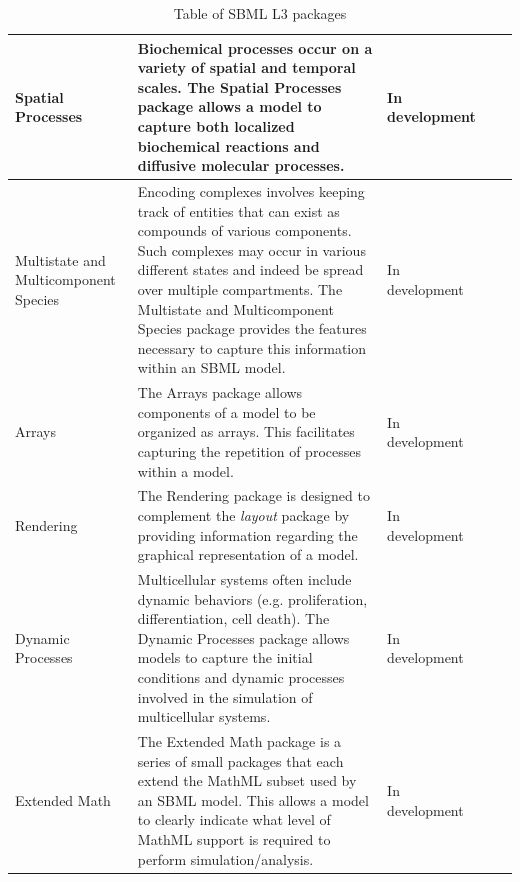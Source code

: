 \begin{table}[h!]
\begin{tabular}{|m{8em}|m{25em}|m{5em}|m{5em}|m{1cm}|}
 \hline
Spatial Processes & Biochemical processes occur on a variety of spatial and temporal scales. The Spatial Processes package allows a model to capture both localized biochemical reactions and diffusive molecular processes. & In development & \href{}{} & \citep{} \\
 \hline
Multistate and Multicomponent Species & Encoding complexes involves keeping track of entities that can exist as compounds of various components. Such complexes may occur in various different states and indeed be spread over multiple compartments. The Multistate and Multicomponent Species package provides the features necessary to capture this information within an SBML model. & In development & \href{}{} & \citep{} \\
 \hline
Arrays & The Arrays package allows components of a model to be organized as arrays. This facilitates capturing the repetition of processes within a model. & In development & \href{}{} & \citep{} \\
 \hline
Rendering & The Rendering package is designed to complement the \textit{layout} package by providing information regarding the graphical representation of a model. & In development & \href{}{} & \citep{} \\
 \hline
Dynamic Processes & Multicellular systems often include dynamic behaviors (e.g. proliferation, differentiation, cell death). The Dynamic Processes package allows models to capture the initial conditions and dynamic processes involved in the simulation of multicellular systems. & In development & \href{}{} & \citep{} \\
 \hline
Extended Math & The Extended Math package is a series of small packages that each extend the MathML subset used by an SBML model. This allows a model to clearly indicate what level of MathML support is required to perform simulation/analysis. & In development & \href{}{} & \citep{} \\
 \hline
 \end{tabular}
 \caption{Table of SBML L3 packages}
\end{table}





